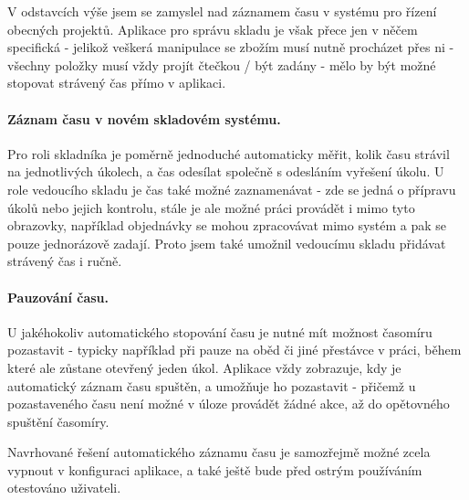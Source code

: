 V odstavcích výše jsem se zamyslel nad záznamem času v systému pro řízení obecných projektů. Aplikace pro správu skladu je však přece jen v něčem specifická - jelikož veškerá manipulace se zbožím musí nutně procházet přes ni - všechny položky musí vždy projít čtečkou / být zadány - mělo by být možné stopovat strávený čas přímo v aplikaci.

\paragraph{Záznam času v novém skladovém systému.} Pro roli skladníka je poměrně jednoduché automaticky měřit, kolik času strávil na jednotlivých úkolech, a čas odesílat společně s odesláním vyřešení úkolu. U role vedoucího skladu je čas také možné zaznamenávat - zde se jedná o přípravu úkolů nebo jejich kontrolu, stále je ale možné práci provádět i mimo tyto obrazovky, například objednávky se mohou zpracovávat mimo systém a pak se pouze jednorázově zadají. Proto jsem také umožnil vedoucímu skladu přidávat strávený čas i ručně.

\paragraph{Pauzování času.} U jakéhokoliv automatického stopování času je nutné mít možnost časomíru pozastavit - typicky například při pauze na oběd či jiné přestávce v práci, během které ale zůstane otevřený jeden úkol. Aplikace vždy zobrazuje, kdy je automatický záznam času spuštěn, a umožňuje ho pozastavit - přičemž u pozastaveného času není možné v úloze provádět žádné akce, až do opětovného spuštění časomíry.

Navrhované řešení automatického záznamu času je samozřejmě možné zcela vypnout v konfiguraci aplikace, a také ještě bude před ostrým používáním otestováno uživateli. 


% 
% 
% 
% 
% 
% 
% 
% 
% 



